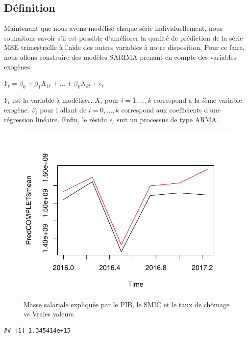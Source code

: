 \documentclass[11pt,]{article}
\begin{document}
\subsection{Définition}\label{definition-2}

Maintenant que nous avons modélisé chaque série individuellement, nous
souhaitons savoir s'il est possible d'améliorer la qualité de prédiction
de la série MSE trimestrielle à l'aide des autres variables à notre
disposition. Pour ce faire, nous allons construire des modèles SARIMA
prenant en compte des variables exogènes.

\(Y_{t} = \beta_{0} +\beta_{1}X_{1t} + ... + \beta_{k}X_{kt} + \epsilon_{t}\)

\(Y_{t}\) est la variable à modéliser. \(X_{i}\) pour \(i = 1, ..., k\)
correspond à la \(i\)ème variable exogène. \(\beta_{i}\) pour i allant
de \(i = 0, ..., k\) correspond aux coefficients d'une régression
linéaire. Enfin, le résidu \(\epsilon_{t}\) suit un processus de type
ARMA.

\begin{figure}

{\centering \includegraphics{Rapport_final_files/figure-latex/unnamed-chunk-59-1} 

}

\caption{\label{fig35} Masse salariale expliquée par le PIB, le SMIC et le taux de chômage vs Vraies valeurs}\label{fig:unnamed-chunk-59}
\end{figure}

\begin{verbatim}
## [1] 1.345414e+15
\end{verbatim}
\end{document}
